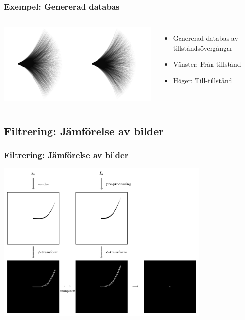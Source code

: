\documentclass[]{beamer}
\renewcommand{\ae}{\"{a}}
\renewcommand{\oe}{\"{o}}
\begin{document}
\begin{frame}
  \frametitle{Exempel: Genererad databas}
  \begin{columns}[c]
    \column{2in}
    \includegraphics[width=1\textwidth]{database_gwhisker_spline3_n2048_from_to_fixed.png}
    
    \column{2in}
    \begin{itemize}
    \item Genererad databas av tillst\aa nds\oe verg\aa ngar
    \item V\ae nster: Fr\aa n-tillst\aa nd
    \item H\oe ger: Till-tillst\aa nd
    \end{itemize}
  \end{columns}
\end{frame}

\subsection{Filtrering: J\ae mf\oe relse av bilder}
\begin{frame}
  \frametitle{Filtrering: J\ae mf\oe relse av bilder}
  \begin{center}
    \includegraphics[width=0.8\textwidth]{whisker_compare.pdf}
  \end{center}
\end{frame}
\end{document}
